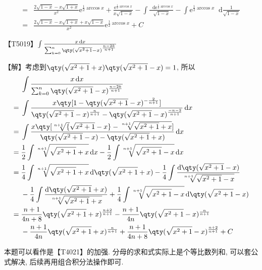 \documentclass{ctexbook}
\newcommand{\e}{\mathrm{e}}
\newcommand*{\dif}{\mathop{}\!\mathrm{d}}
\begin{document}
{\begin{align*}
={}&\frac{2\sqrt{1-x}-x\sqrt{1+x}}{x^{2}}\e^{\frac{1}{2}\arccos{x}}+\frac{\e^{\frac{1}{2}\arccos{x}}}{x\sqrt{1-x}}-\int\frac{\dif{\e^{\frac{1}{2}\arccos{x}}}}{\sqrt{1-x}}-\int\e^{\frac{1}{2}\arccos{x}}\dif{\frac{1}{\sqrt{1-x}}}\\
={}&\frac{2\sqrt{1-x}-x\sqrt{1+x}+x\sqrt{1-x}}{x^{2}}\e^{\frac{1}{2}\arccos{x}}+C
\end{align*}\par
【T5019】$\int\frac{x\dif{x}}{\sum_{k=0}^{n}\qty(\sqrt{x^{2}+1}-x)^{\frac{n-2k}{n+1}}}$\par
【解】考虑到$\qty(\sqrt{x^{2}+1}+x)\qty(\sqrt{x^{2}+1}-x)=1$, 所以
\begin{align*}
{}&\int\frac{x\dif{x}}{\sum_{k=0}^{n}\qty(\sqrt{x^{2}+1}-x)^{\frac{n-2k}{n+1}}}\\
={}&\int\frac{x\qty[1-\qty(\sqrt{x^{2}+1}-x)^{-\frac{2}{n+1}}]}{\qty(\sqrt{x^{2}+1}-x)^{\frac{n}{n+1}}-\qty(\sqrt{x^{2}+1}-x)^{\frac{-n-2}{n+1}}}\dif{x}\\
={}&\int\frac{x\qty[\sqrt[n+1]{\sqrt{x^{2}+1}-x}-\sqrt[n+1]{\sqrt{x^{2}+1}+x}]}{\qty(\sqrt{x^{2}+1}-x)-\qty(\sqrt{x^{2}+1}+x)}\dif{x}\\
={}&\frac{1}{2}\int\sqrt[n+1]{\sqrt{x^{2}+1}+x}\dif{x}-\frac{1}{2}\int\sqrt[n+1]{\sqrt{x^{2}+1}-x}\dif{x}\\
={}&\frac{1}{4}\int\sqrt[n+1]{\sqrt{x^{2}+1}+x}\dif{\qty(\sqrt{x^{2}+1}+x)}-\frac{1}{4}\int\frac{\dif{\qty(\sqrt{x^{2}+1}-x)}}{\sqrt[n+1]{\sqrt{x^{2}+1}-x}}\\
{}&-\frac{1}{4}\int\frac{\dif{\qty(\sqrt{x^{2}+1}+x)}}{\sqrt[n+1]{\sqrt{x^{2}+1}+x}}+\frac{1}{4}\int\sqrt[n+1]{\sqrt{x^{2}+1}-x}\dif{\qty(\sqrt{x^{2}+1}-x)}\\
={}&\frac{n+1}{4n+8}\qty(\sqrt{x^{2}+1}+x)^{\frac{n+2}{n+1}}-\frac{n+1}{4n}\qty(\sqrt{x^{2}+1}-x)^{\frac{n}{n+1}}\\
{}&-\frac{n+1}{4n}\qty(\sqrt{x^{2}+1}+x)^{\frac{n}{n+1}}+\frac{n+1}{4n+8}\qty(\sqrt{x^{2}+1}-x)^{\frac{n+2}{n+1}}+C
\end{align*}\par
{\kaishu 本题可以看作是【T4021】的加强. 分母的求和式实际上是个等比数列和, 可以套公式解决, 后续再用组合积分法操作即可. \par}
}
\end{document}
